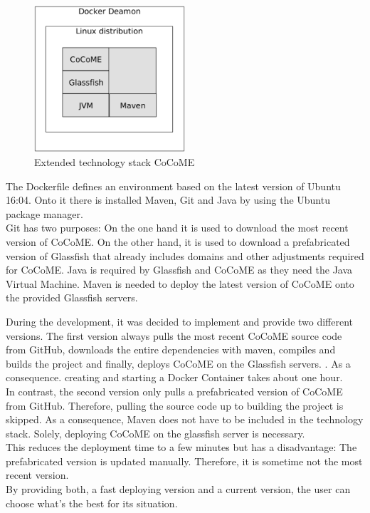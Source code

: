 	\begin{figure}[!h]
		\centering
		\includegraphics[width = 0.5\textwidth]{img/tech_stack_CoCoME.png}
		\caption{Extended technology stack CoCoME}
		\label{techStack}
	\end{figure}
	
The Dockerfile defines an environment based on the latest version of Ubuntu 16:04. Onto it there is installed Maven, Git and Java by using the Ubuntu package manager.\\
Git has two purposes: On the one hand it is used to download the most recent version of CoCoME.	On the other hand, it is used to download a prefabricated version of Glassfish that already includes domains and other adjustments required for CoCoME. Java is required by Glassfish and CoCoME as they need the Java Virtual Machine. Maven is needed to deploy the latest version of CoCoME onto the provided Glassfish servers.
	
	
	During the development, it was decided to implement and provide two different versions. The first version always pulls the most recent CoCoME source code from GitHub, downloads the entire dependencies with maven, compiles and builds the project and finally, deploys CoCoME on the Glassfish servers. . As a consequence. creating and starting a Docker Container takes about one hour.\\
	In contrast, the second version only  pulls a prefabricated version of CoCoME from GitHub. Therefore, pulling the source code up to building the project is skipped. As a consequence, Maven does not have to be included in the technology stack. Solely, deploying CoCoME on the glassfish server is necessary.\\
	This reduces the deployment time to a few minutes but has a disadvantage: The prefabricated version is updated manually. Therefore, it is sometime not the most recent version.\\
	By providing both, a fast deploying version and a current version, the user can choose what's the best for its situation.
	

